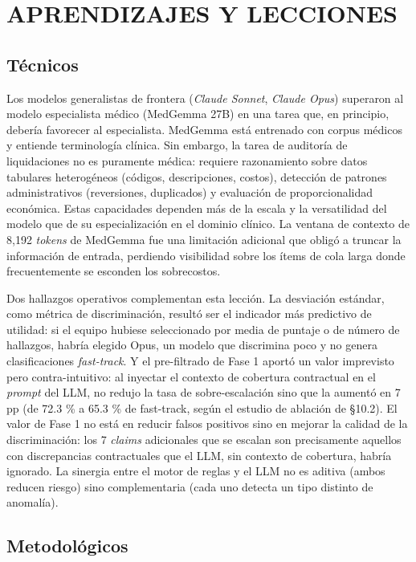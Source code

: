 \chapter{APRENDIZAJES Y LECCIONES}

\section{Técnicos}

Los modelos generalistas de frontera (\textit{Claude Sonnet}, \textit{Claude Opus}) superaron al modelo especialista médico (MedGemma 27B) en una tarea que, en principio, debería favorecer al especialista. MedGemma está entrenado con corpus médicos y entiende terminología clínica. Sin embargo, la tarea de auditoría de liquidaciones no es puramente médica: requiere razonamiento sobre datos tabulares heterogéneos (códigos, descripciones, costos), detección de patrones administrativos (reversiones, duplicados) y evaluación de proporcionalidad económica. Estas capacidades dependen más de la escala y la versatilidad del modelo que de su especialización en el dominio clínico. La ventana de contexto de 8,192 \textit{tokens} de MedGemma fue una limitación adicional que obligó a truncar la información de entrada, perdiendo visibilidad sobre los ítems de cola larga donde frecuentemente se esconden los sobrecostos.

Dos hallazgos operativos complementan esta lección. La desviación estándar, como métrica de discriminación, resultó ser el indicador más predictivo de utilidad: si el equipo hubiese seleccionado por media de puntaje o de número de hallazgos, habría elegido Opus, un modelo que discrimina poco y no genera clasificaciones \textit{fast-track}. Y el pre-filtrado de Fase 1 aportó un valor imprevisto pero contra-intuitivo: al inyectar el contexto de cobertura contractual en el \textit{prompt} del LLM, no redujo la tasa de sobre-escalación sino que la aumentó en 7 pp (de 72.3 \% a 65.3 \% de fast-track, según el estudio de ablación de §10.2). El valor de Fase 1 no está en reducir falsos positivos sino en mejorar la calidad de la discriminación: los 7 \textit{claims} adicionales que se escalan son precisamente aquellos con discrepancias contractuales que el LLM, sin contexto de cobertura, habría ignorado. La sinergia entre el motor de reglas y el LLM no es aditiva (ambos reducen riesgo) sino complementaria (cada uno detecta un tipo distinto de anomalía).

\section{Metodológicos}

